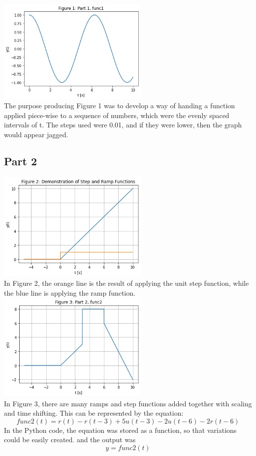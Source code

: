 \documentclass[12pt,a4paper]{article}
\begin{document}
\includegraphics[width=0.55\textwidth]{Figure1.png}\\
The purpose producing Figure 1 was to develop a way of handing a function applied piece-wise to a sequence of numbers, which were the evenly spaced intervals of t.  The steps used were 0.01, and if they were lower, then the graph would appear jagged.

\subsection*{Part 2}
\includegraphics[width=0.55\textwidth]{Figure2.png}\\
In Figure 2, the orange line is the result of applying the unit step function, while the blue line is applying the ramp function.\\
\includegraphics[width=0.55\textwidth]{Figure3.png}\\
In Figure 3, there are many ramps and step functions added together with scaling and time shifting. This can be represented by the equation:
\[func2(t) = r(t)-r(t-3)+5u(t-3)-2u(t-6)-2r(t-6)\]
In the Python code, the equation was stored as a function, so that variations could be easily created. and the output was
\[y=func2(t)\]\\
\end{document}
